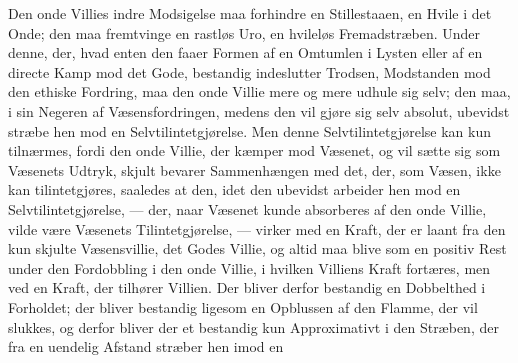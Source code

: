 Den onde Villies indre Modsigelse maa forhindre en Stillestaaen, en Hvile i det
Onde; den maa fremtvinge en rastløs Uro, en hvileløs Fremadstræben. Under denne,
der, hvad enten den faaer Formen af en Omtumlen i Lysten eller af en directe Kamp
mod det Gode, bestandig indeslutter Trodsen, Modstanden mod den ethiske Fordring,
maa den onde Villie mere og mere udhule sig selv; den maa, i sin Negeren af
Væsensfordringen, medens den vil gjøre sig selv absolut, ubevidst stræbe hen mod
en Selvtilintetgjørelse. Men denne Selvtilintetgjørelse kan kun tilnærmes, fordi
den onde Villie, der kæmper mod Væsenet, og vil sætte sig som Væsenets Udtryk,
skjult bevarer Sammenhængen med det,
 der, som Væsen, ikke kan tilintetgjøres, saaledes at den, idet den ubevidst
arbeider hen mod en Selvtilintetgjørelse, --- der, naar Væsenet kunde absorberes
af den onde Villie, vilde være Væsenets Tilintetgjørelse, --- virker med en
Kraft, der er laant fra den kun skjulte Væsensvillie, det Godes Villie, og altid
maa blive som en positiv Rest under den Fordobbling i den onde Villie, i hvilken
Villiens Kraft fortæres, men ved en Kraft, der tilhører Villien. Der bliver
derfor bestandig en Dobbelthed i Forholdet; der bliver bestandig ligesom en
Opblussen af den Flamme, der vil slukkes, og derfor bliver der et bestandig kun
Approximativt i den Stræben, der fra en uendelig Afstand stræber hen imod en
